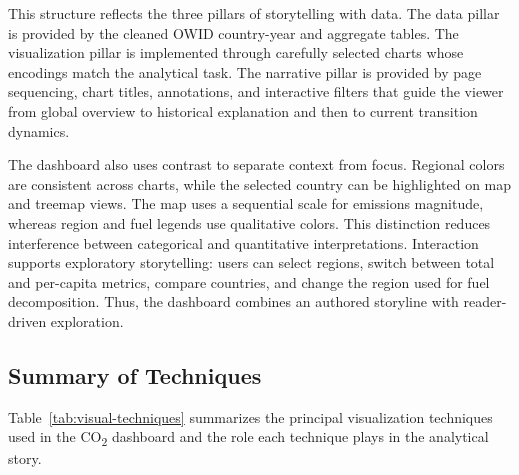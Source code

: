 \documentclass[a4paper,12pt]{article}
\begin{document}
This structure reflects the three pillars of storytelling with data. The data pillar is
provided by the cleaned OWID country-year and aggregate tables. The visualization pillar
is implemented through carefully selected charts whose encodings match the analytical
task. The narrative pillar is provided by page sequencing, chart titles, annotations, and
interactive filters that guide the viewer from global overview to historical explanation
and then to current transition dynamics.

The dashboard also uses contrast to separate context from focus. Regional colors are
consistent across charts, while the selected country can be highlighted on map and treemap
views. The map uses a sequential scale for emissions magnitude, whereas region and fuel
legends use qualitative colors. This distinction reduces interference between categorical
and quantitative interpretations. Interaction supports exploratory storytelling: users
can select regions, switch between total and per-capita metrics, compare countries, and
change the region used for fuel decomposition. Thus, the dashboard combines an authored
storyline with reader-driven exploration.

\subsection{Summary of Techniques}
Table~\ref{tab:visual-techniques} summarizes the principal visualization techniques used
in the CO\textsubscript{2} dashboard and the role each technique plays in the analytical
story.
\end{document}
